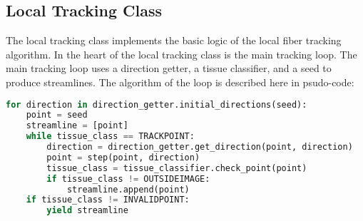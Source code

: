 \subsection{Local Tracking Class}
    The local tracking class implements the basic logic of the local fiber tracking algorithm. In the heart of the local tracking class is the main tracking loop. The main tracking loop uses a direction getter, a tissue classifier, and a seed to produce streamlines. The algorithm of the loop is described here in psudo-code:
\begin{lstlisting}[language=python]
for direction in direction_getter.initial_directions(seed):
    point = seed
    streamline = [point]
    while tissue_class == TRACKPOINT:
        direction = direction_getter.get_direction(point, direction)
        point = step(point, direction)
        tissue_class = tissue_classifier.check_point(point)
        if tissue_class != OUTSIDEIMAGE:
            streamline.append(point)
    if tissue_class != INVALIDPOINT:
        yield streamline
\end{lstlisting}